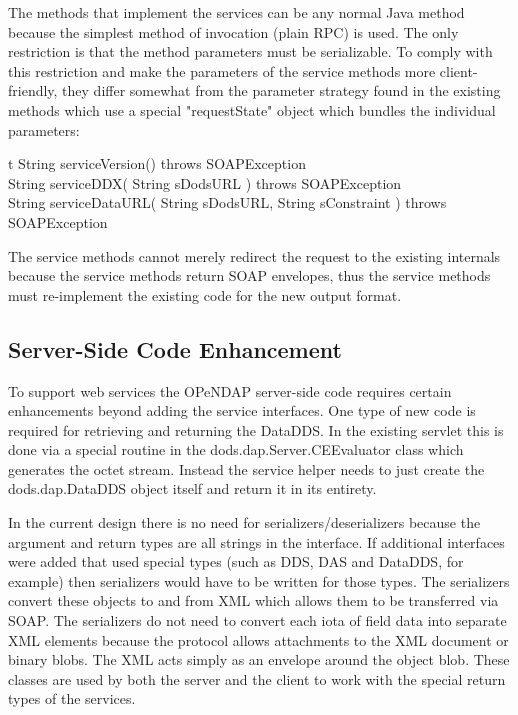 \documentclass[justify]{dods-paper}
\begin{document}
The methods that implement the services can be any normal Java method because the simplest method of invocation (plain RPC) is used. The only restriction is that the method parameters must be serializable. To comply with this restriction and make the parameters of the service methods more client-friendly, they differ somewhat from the parameter strategy found in the existing methods which use a special "requestState" object which bundles the individual parameters:

\begin{vcode}{t}
    String serviceVersion() throws SOAPException\\
    String serviceDDX( String sDodsURL ) throws SOAPException\\
    String serviceDataURL( String sDodsURL, String sConstraint ) throws SOAPException
\end{vcode}

The service methods cannot merely redirect the request to the existing internals because the service methods return SOAP envelopes, thus the service methods must re-implement the existing code for the new output format.


\subsection{Server-Side Code Enhancement}

To support web services the OPeNDAP server-side code requires certain enhancements beyond adding the service interfaces. One type of new code is required for retrieving and returning the DataDDS. In the existing servlet this is done via a special routine in the dods.dap.Server.CEEvaluator class which generates the octet stream. Instead the service helper needs to just create the dods.dap.DataDDS object itself and return it in its entirety.

In the current design there is no need for serializers/deserializers because the argument and return types are all strings in the interface. If additional interfaces were added that used special types (such as DDS, DAS and DataDDS, for example) then serializers would have to be written for those types. The serializers convert these objects to and from XML which allows them to be transferred via SOAP. The serializers do not need to convert each iota of field data into separate XML elements because the protocol allows attachments to the XML document or binary blobs. The XML acts simply as an envelope around the object blob. These classes are used by both the server and the client to work with the special return types of the services.
\end{document}
